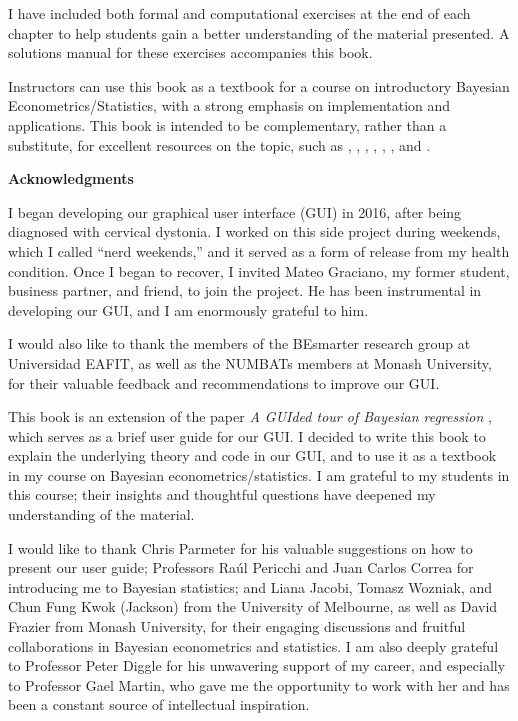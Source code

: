 I have included both formal and computational exercises at the end of each chapter to help students gain a better understanding of the material presented. A solutions manual for these exercises accompanies this book.

Instructors can use this book as a textbook for a course on introductory Bayesian Econometrics/Statistics, with a strong emphasis on implementation and applications. This book is intended to be complementary, rather than a substitute, for excellent resources on the topic, such as \cite{gelman2021bayesian}, \cite{chan2019bayesian}, \cite{rossi2012bayesian}, \cite{greenberg2012introduction}, \cite{geweke2005contemporary}, \cite{lancaster2004introduction}, and \cite{koop2003bayesian}.


\textbf{Acknowledgments}

I began developing our graphical user interface (GUI) in 2016, after being diagnosed with cervical dystonia. I worked on this side project during weekends, which I called ``nerd weekends,'' and it served as a form of release from my health condition. Once I began to recover, I invited Mateo Graciano, my former student, business partner, and friend, to join the project. He has been instrumental in developing our GUI, and I am enormously grateful to him. 

I would also like to thank the members of the BEsmarter research group at Universidad EAFIT, as well as the NUMBATs members at Monash University, for their valuable feedback and recommendations to improve our GUI.

This book is an extension of the paper \textit{A GUIded tour of Bayesian regression} \cite{Ramirez2020}, which serves as a brief user guide for our GUI. I decided to write this book to explain the underlying theory and code in our GUI, and to use it as a textbook in my course on Bayesian econometrics/statistics. I am grateful to my students in this course; their insights and thoughtful questions have deepened my understanding of the material.

I would like to thank Chris Parmeter for his valuable suggestions on how to present our user guide; Professors Raúl Pericchi and Juan Carlos Correa for introducing me to Bayesian statistics; and Liana Jacobi, Tomasz Wozniak, and Chun Fung Kwok (Jackson) from the University of Melbourne, as well as David Frazier from Monash University, for their engaging discussions and fruitful collaborations in Bayesian econometrics and statistics. I am also deeply grateful to Professor Peter Diggle for his unwavering support of my career, and especially to Professor Gael Martin, who gave me the opportunity to work with her and has been a constant source of intellectual inspiration.  

